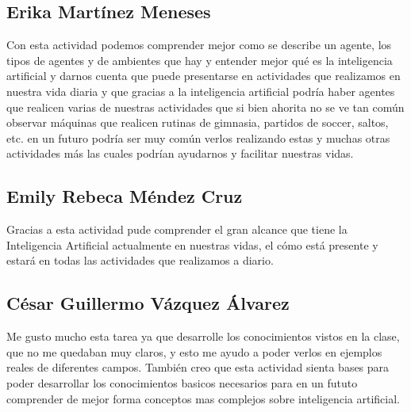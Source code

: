 \documentclass{article}
\begin{document}
        \subsection{Erika Martínez Meneses}
            Con esta actividad podemos comprender mejor como se describe un agente, los tipos de agentes y de ambientes que hay y entender mejor qué es la inteligencia artificial y darnos cuenta que puede presentarse en actividades que realizamos en nuestra vida diaria y que gracias a la inteligencia artificial podría haber agentes que realicen varias de nuestras actividades que si bien ahorita no se ve tan común observar máquinas que realicen rutinas de gimnasia, partidos de soccer, saltos, etc. en un futuro podría ser  muy común verlos realizando estas y muchas otras actividades más las cuales podrían ayudarnos y facilitar nuestras vidas.


        \subsection{Emily Rebeca Méndez Cruz}
            Gracias a esta actividad pude comprender el gran alcance que tiene la Inteligencia Artificial actualmente en nuestras vidas, el cómo está presente y estará en todas las actividades que realizamos a diario.

        \subsection{César Guillermo Vázquez Álvarez}
        Me gusto mucho esta tarea ya que desarrolle los conocimientos vistos en la clase, que no me quedaban muy claros, y esto me ayudo a poder verlos en ejemplos reales de diferentes campos. También creo que esta actividad sienta bases para poder desarrollar los conocimientos basicos necesarios para en un fututo comprender de mejor forma conceptos mas complejos sobre inteligencia artificial.
\end{document}
